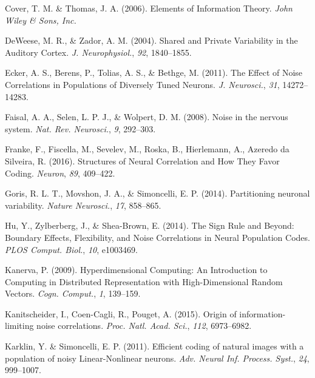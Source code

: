 \documentclass[12pt]{article}
\begin{document}
\begin{thebibliography}{100}
Cover, T. M. \& Thomas, J. A. (2006).
\newblock Elements of Information Theory.
\newblock \emph{John Wiley \& Sons, Inc.}

DeWeese, M. R., \& Zador, A. M. (2004).
\newblock Shared and Private Variability in the Auditory Cortex.
\newblock \emph{J. Neurophysiol.}, \emph{92}, 1840--1855.

Ecker, A. S., Berens, P., Tolias, A. S., \& Bethge, M. (2011).
\newblock The Effect of Noise Correlations in Populations of Diversely Tuned Neurons.
\newblock \emph{J. Neurosci.}, \emph{31}, 14272--14283.

Faisal, A. A., Selen, L. P. J., \& Wolpert, D. M. (2008).
\newblock Noise in the nervous system.
\newblock \emph{Nat. Rev. Neurosci.}, \emph{9}, 292--303.

Franke, F., Fiscella, M., Sevelev, M., Roska, B., Hierlemann, A., Azeredo da Silveira, R. (2016).
\newblock Structures of Neural Correlation and How They Favor Coding.
\newblock \emph{Neuron}, \emph{89}, 409--422.

Goris, R. L. T., Movshon, J. A., \& Simoncelli, E. P. (2014).
\newblock Partitioning neuronal variability.
\newblock \emph{Nature Neurosci.}, \emph{17}, 858--865.

Hu, Y., Zylberberg, J., \& Shea-Brown, E. (2014).
\newblock The Sign Rule and Beyond: Boundary Effects, Flexibility, and Noise Correlations in Neural Population Codes. 
\newblock \emph{PLOS Comput. Biol.}, \emph{10}, e1003469.

Kanerva, P. (2009).
\newblock Hyperdimensional Computing: An Introduction to Computing
in Distributed Representation with High-Dimensional
Random Vectors.
\newblock \emph{Cogn. Comput.}, \emph{1}, 139--159.

Kanitscheider, I., Coen-Cagli, R., Pouget, A. (2015).
\newblock Origin of information-limiting noise correlations.
\newblock \emph{Proc. Natl. Acad. Sci.}, \emph{112}, 6973--6982.

Karklin, Y. \& Simoncelli, E. P. (2011).
\newblock Efficient coding of natural images with a population of noisy
Linear-Nonlinear neurons.
\newblock \emph{Adv. Neural Inf. Process. Syst.}, \emph{24}, 999--1007.


\end{thebibliography}
\end{document}
